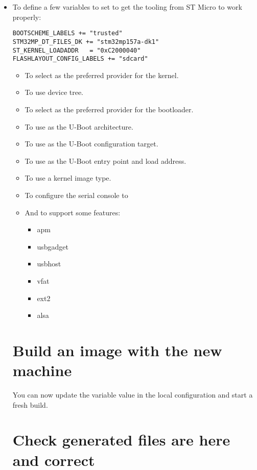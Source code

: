 \if{}
\begin{itemize}
  \item To define a few variables to set to get the tooling from ST
    Micro to work properly:
\begin{verbatim}
BOOTSCHEME_LABELS += "trusted"
STM32MP_DT_FILES_DK += "stm32mp157a-dk1"
ST_KERNEL_LOADADDR   = "0xC2000040"
FLASHLAYOUT_CONFIG_LABELS += "sdcard"
\end{verbatim}
\else
\begin{itemize}
  \item To select  as the preferred provider
    for the kernel.
  \item To use  device tree.
  \item To select  as the preferred provider
    for the bootloader.
  \item To use  as the U-Boot architecture.
  \item To use  as the U-Boot
    configuration target.
  \item To use  as the U-Boot entry point and load
    address.
  \item To use a  kernel image type.
  \item To configure the serial console to 
\fi
  \item And to support some features:
    \begin{itemize}
      \item apm
      \item usbgadget
      \item usbhost
      \item vfat
      \item ext2
      \item alsa
    \end{itemize}
\end{itemize}
\section{Build an image with the new machine}

You can now update the  variable value in the local configuration
and start a fresh build.

\section{Check generated files are here and correct}


\end{itemize}
